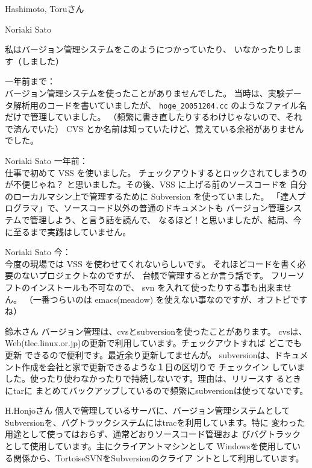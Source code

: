 \documentclass[cjk,dvipdfmx,12pt]{beamer}
\begin{document}
\begin{frame}{Hashimoto, Toruさん}
\end{frame}\begin{frame}{Noriaki Sato}

私はバージョン管理システムをこのようにつかっていたり、
いなかったりします（しました）

一年前まで：\\
バージョン管理システムを使ったことがありませんでした。
当時は、実験データ解析用のコードを書いていましたが、
\texttt{hoge\_{}20051204.cc} のようなファイル名だけで管理していました。
（頻繁に書き直したりするわけじゃないので、それで済んでいた）
CVS とか名前は知っていたけど、覚えている余裕がありませんでした。

\end{frame}\begin{frame}{Noriaki Sato}
一年前：\\
仕事で初めて VSS を使いました。
チェックアウトするとロックされてしまうのが不便じゃね？
と思いました。その後、VSS に上げる前のソースコードを
自分のローカルマシン上で管理するために Subversion を使っていました。
「達人プログラマ」で、ソースコード以外の普通のドキュメントも
バージョン管理システムで管理しよう、と言う話を読んで、
なるほど！と思いましたが、結局、今に至るまで実践はしていません。

\end{frame}\begin{frame}{Noriaki Sato}
今：\\
今度の現場では VSS を使わせてくれないらしいです。
それほどコードを書く必要のないプロジェクトなのですが、
台帳で管理するとか言う話です。
フリーソフトのインストールも不可なので、
svn を入れて使ったりする事も出来ません。
（一番つらいのは emacs(meadow) を使えない事なのですが、オフトピですね）


\end{frame}\begin{frame}{鈴木さん}
バージョン管理は、cvsとsubversionを使ったことがあります。
cvsは、Web(tlec.linux.or.jp)の更新で利用しています。チェックアウトすれば
どこでも更新
できるので便利です。最近余り更新してませんが。
subversionは、ドキュメント作成を会社と家で更新できるような１日の区切りで
チェックイン
していました。使ったり使わなかったりで持続しないです。理由は、リリースす
るときにtarに
まとめてバックアップしているので頻繁にsubversionは使ってないです。


\end{frame}\begin{frame}{H.Honjoさん}
個人で管理しているサーバに、バージョン管理システムとして
Subversionを、バグトラックシステムにはtracを利用しています。特に
変わった用途として使ってはおらず、通常どおりソースコード管理およ
びバグトラックとして使用しています。主にクライアントマシンとして
Windowsを使用している関係から、TortoiseSVNをSubversionのクライア
ントとして利用しています。


\end{frame}
\end{document}
